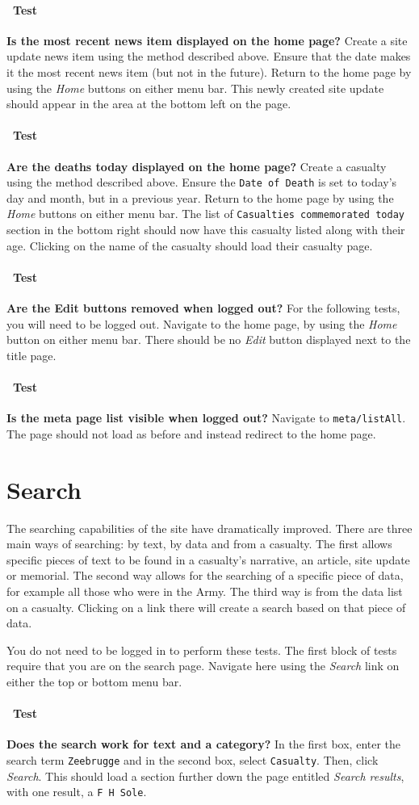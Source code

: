 \documentclass[12pt]{article}
\newcounter{Test}
\newcommand{\test}[1]{%
\stepcounter{Test}%
\paragraph{\Circle\ Test \theTest} \textbf{#1} }
\begin{document}
\test{Is the most recent news item displayed on the home page?}
Create a site update news item using the method described above. Ensure that the date makes it the most recent news item (but not in the future). Return to the home page by using the \textit{Home} buttons on either menu bar. This newly created site update should appear in the area at the bottom left on the page.

\test{Are the deaths today displayed on the home page?}
Create a casualty using the method described above. Ensure the \texttt{Date of Death} is set to today's day and month, but in a previous year. Return to the home page by using the \textit{Home} buttons on either menu bar. The list of \texttt{Casualties commemorated today} section in the bottom right should now have this casualty listed along with their age. Clicking on the name of the casualty should load their casualty page.

\test{Are the Edit buttons removed when logged out?}
For the following tests, you will need to be logged out. Navigate to the home page, by using the \textit{Home} button on either menu bar. There should be no \textit{Edit} button displayed next to the title page.

\test{Is the meta page list visible when logged out?}
Navigate to \texttt{meta/listAll}. The page should not load as before and instead redirect to the home page.

\section{Search}\label{sec:search}

The searching capabilities of the site have dramatically improved. There are three main ways of searching: by text, by data and from a casualty. The first allows specific pieces of text to be found in a casualty's narrative, an article, site update or memorial. The second way allows for the searching of a specific piece of data, for example all those who were in the Army. The third way is from the data list on a casualty. Clicking on a link there will create a search based on that piece of data.

You do not need to be logged in to perform these tests. The first block of tests require that you are on the search page. Navigate here using the \textit{Search} link on either the top or bottom menu bar. 

\test{Does the search work for text and a category?}
In the first box, enter the search term \texttt{Zeebrugge} and in the second box, select \texttt{Casualty}. Then, click \textit{Search}. This should load a section further down the page entitled \textit{Search results}, with one result, a \texttt{F H Sole}.
\end{document}
